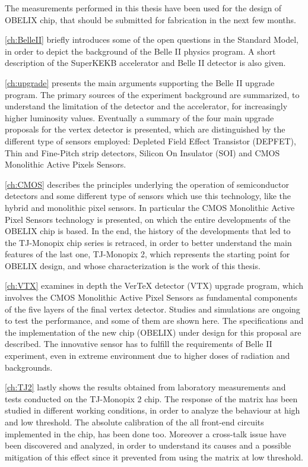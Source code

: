 The measurements performed in this thesis have been used for the design of OBELIX chip, that should be submitted for fabrication in the next few months.



\autoref{ch:BelleII} briefly introduces some of the open questions in the Standard Model, in order to depict the background of the Belle II physics program. A short description of the SuperKEKB accelerator and Belle II detector is also given. 

\autoref{ch:upgrade} presents the main arguments supporting the Belle II upgrade program. The primary sources of the experiment background are summarized, to understand the limitation of the detector and the accelerator, for increasingly higher luminosity values. Eventually a summary of the four main upgrade proposals for the vertex detector is presented, which are distinguished by the different type of sensors employed: Depleted Field Effect Transistor (DEPFET), Thin and Fine-Pitch strip detectors, Silicon On Insulator (SOI) and CMOS Monolithic Active Pixels Sensors.

\autoref{ch:CMOS} describes the principles underlying the operation of semiconductor detectors and some different type of sensors which use this technology, like the hybrid and monolithic pixel sensors. In particular the CMOS Monolithic Active Pixel Sensors technology is presented, on which the entire developments of the OBELIX chip is based. In the end, the history of the developments that led to the TJ-Monopix chip series is retraced, in order to better understand the main features of the last one, TJ-Monopix 2, which represents the starting point for OBELIX design, and whose characterization is the work of this thesis.

\autoref{ch:VTX} examines in depth the VerTeX detector (VTX) upgrade program, which involves the CMOS Monolithic Active Pixel Sensors as fundamental components of the five layers of the final vertex detector. Studies and simulations are ongoing to test the performance, and some of them are shown here. The specifications and the implementation of the new chip (OBELIX) under design for this proposal are described. The innovative sensor has to fulfill the requirements of Belle II experiment, even in extreme environment due to higher doses of radiation and backgrounds.


\autoref{ch:TJ2} lastly shows the results obtained from laboratory measurements and tests conducted on the TJ-Monopix 2 chip. The response of the matrix has been studied in different working conditions, in order to analyze the behaviour at high and low threshold. The absolute calibration of the all front-end circuits implemented in the chip, has been done too.
Moreover a cross-talk issue have been discovered and analyzed, in order to understand its causes and a possible mitigation of this effect since it prevented from using the matrix at low threshold.

